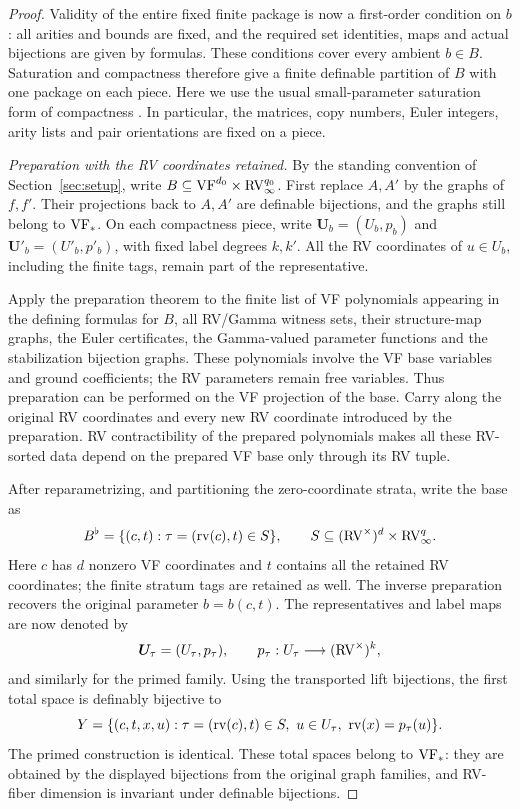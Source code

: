 \begin{proof}
Validity of the entire fixed finite package is now a
first-order condition on $b$: all arities and bounds are
fixed, and the required set identities, maps and actual
bijections are given by formulas.
These conditions cover every ambient $b\in B$.
Saturation and compactness therefore give a finite
definable partition of $B$ with one package on each piece.
Here we use the usual small-parameter saturation form of compactness
\cite[Chapter 4]{Marker}.
In particular, the matrices, copy numbers, Euler integers,
arity lists and pair orientations are fixed on a piece.

\medskip
\noindent\emph{Preparation with the RV coordinates retained.}
By the standing convention of Section~\ref{sec:setup}, write
$B\subseteq\mathrm{VF}^{d_0}\times\mathrm{RV}_\infty^{q_0}$.
First replace $A,A'$ by the graphs of $f,f'$.
Their projections back to $A,A'$ are definable bijections,
and the graphs still belong to $\mathrm{VF}_*$.
On each compactness piece, write
$\bm U_b=(U_b,p_b)$ and $\bm U'_b=(U'_b,p'_b)$,
with fixed label degrees $k,k'$.
All the RV coordinates of $u\in U_b$, including the finite
tags, remain part of the representative.

Apply the preparation theorem to the finite list of
VF polynomials appearing in the defining formulas for $B$,
all RV/Gamma witness sets, their structure-map graphs, the Euler certificates, the Gamma-valued parameter functions and the stabilization bijection graphs.
These polynomials involve the VF base variables and ground
coefficients; the RV parameters remain free variables.
Thus preparation can be performed on the VF projection of
the base. Carry along the original RV coordinates and every
new RV coordinate introduced by the preparation.
RV contractibility of the prepared polynomials makes all
these RV-sorted data depend on the prepared VF base only
through its RV tuple.

After reparametrizing, and partitioning the zero-coordinate
strata, write the base as
\[
 B^\flat=\{(c,t):\tau=(\operatorname{rv}(c),t)\in S\},\qquad
 S\subseteq(\mathrm{RV}^\times)^d\times\mathrm{RV}_\infty^q.
\]
Here $c$ has $d$ nonzero VF coordinates and $t$ contains
all the retained RV coordinates; the finite stratum tags
are retained as well.
The inverse preparation recovers the original parameter
$b=b(c,t)$.
The representatives and label maps are now denoted by
\[
 \bm U_\tau=(U_\tau,p_\tau),\qquad
 p_\tau:U_\tau\longrightarrow(\mathrm{RV}^\times)^k,
\]
and similarly for the primed family.
Using the transported lift bijections, the first total space
is definably bijective to
\[
 Y=\{(c,t,x,u):
       \tau=(\operatorname{rv}(c),t)\in S,\ u\in U_\tau,\
       \operatorname{rv}(x)=p_\tau(u)\}.
\]
The primed construction is identical.
These total spaces belong to $\mathrm{VF}_*$: they are obtained by
the displayed bijections from the original graph families,
and RV-fiber dimension is invariant under definable
bijections.


\end{proof}
